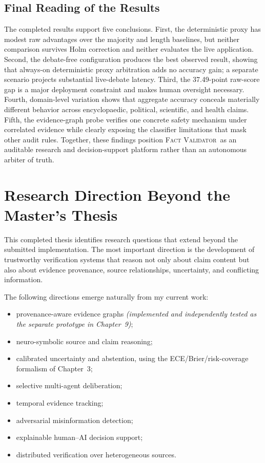 \documentclass[12pt,a4paper,openany]{report}
\newcommand{\system}{\textsc{Fact Validator}}
\begin{document}
\section{Final Reading of the Results}
The completed results support five conclusions. First, the deterministic proxy
has modest raw advantages over the majority and length baselines, but neither
comparison survives Holm correction and neither evaluates the live application.
Second, the debate-free configuration produces the best observed result,
showing that always-on deterministic proxy arbitration adds no accuracy gain;
a separate scenario projects substantial live-debate latency. Third, the
37.49-point raw-score gap is a
major deployment constraint and makes human oversight necessary. Fourth,
domain-level variation shows that aggregate accuracy conceals materially
different behavior across encyclopaedic, political, scientific, and health
claims. Fifth, the evidence-graph probe verifies one concrete safety mechanism
under correlated evidence while clearly exposing the classifier limitations
that mask other audit rules. Together, these findings position \system\ as an
auditable research and decision-support platform rather than an autonomous
arbiter of truth.

\chapter{Research Direction Beyond the Master's Thesis}
This completed thesis identifies research questions that extend beyond the submitted implementation. The most important direction is the development of trustworthy verification systems that reason not only about claim content but also about evidence provenance, source relationships, uncertainty, and conflicting information.

The following directions emerge naturally from my current work:
\begin{itemize}
  \item provenance-aware evidence graphs \emph{(implemented and independently tested as the separate prototype in Chapter~9)};
  \item neuro-symbolic source and claim reasoning;
  \item calibrated uncertainty and abstention, using the ECE/Brier/risk-coverage formalism of Chapter~3;
  \item selective multi-agent deliberation;
  \item temporal evidence tracking;
  \item adversarial misinformation detection;
  \item explainable human--AI decision support;
  \item distributed verification over heterogeneous sources.
\end{itemize}
\end{document}
